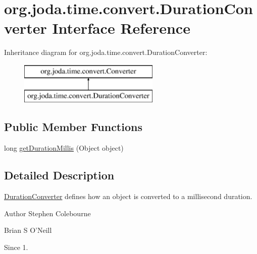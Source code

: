 \hypertarget{interfaceorg_1_1joda_1_1time_1_1convert_1_1_duration_converter}{\section{org.\-joda.\-time.\-convert.\-Duration\-Converter Interface Reference}
\label{interfaceorg_1_1joda_1_1time_1_1convert_1_1_duration_converter}
}
Inheritance diagram for org.\-joda.\-time.\-convert.\-Duration\-Converter\-:\begin{figure}[H]
\begin{center}
\leavevmode
\includegraphics[height=2.000000cm]{interfaceorg_1_1joda_1_1time_1_1convert_1_1_duration_converter}
\end{center}
\end{figure}
\subsection*{Public Member Functions}
\begin{DoxyCompactItemize}
\item 
long \hyperlink{interfaceorg_1_1joda_1_1time_1_1convert_1_1_duration_converter_a321bd5aa0763c7d2140ee567dbcfa6c7}{get\-Duration\-Millis} (Object object)
\end{DoxyCompactItemize}


\subsection{Detailed Description}
\hyperlink{interfaceorg_1_1joda_1_1time_1_1convert_1_1_duration_converter}{Duration\-Converter} defines how an object is converted to a millisecond duration.

\begin{DoxyAuthor}{Author}
Stephen Colebourne 

Brian S O'Neill 
\end{DoxyAuthor}
\begin{DoxySince}{Since}
1. 
\end{DoxySince}


